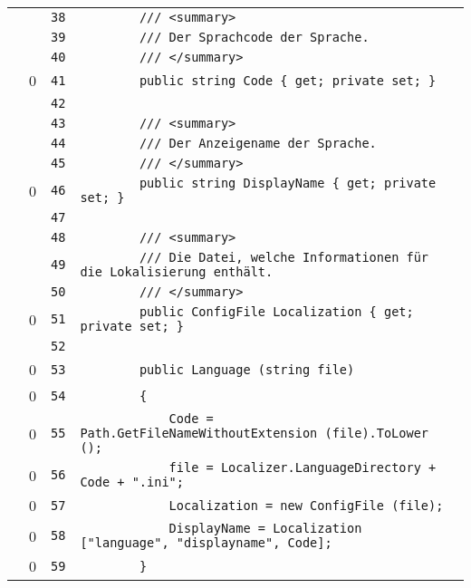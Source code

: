 \documentclass[a4paper,10pt]{article}
\begin{document}
\begin{longtable}[l]{lrrl}
\cellcolor{gray} &  & \verb~38~ & \verb~        /// <summary>~\\
\cellcolor{gray} &  & \verb~39~ & \verb~        /// Der Sprachcode der Sprache.~\\
\cellcolor{gray} &  & \verb~40~ & \verb~        /// </summary>~\\
\cellcolor{red} & 0 & \verb~41~ & \verb~        public string Code { get; private set; }~\\
\cellcolor{gray} &  & \verb~42~ & \verb~~\\
\cellcolor{gray} &  & \verb~43~ & \verb~        /// <summary>~\\
\cellcolor{gray} &  & \verb~44~ & \verb~        /// Der Anzeigename der Sprache.~\\
\cellcolor{gray} &  & \verb~45~ & \verb~        /// </summary>~\\
\cellcolor{red} & 0 & \verb~46~ & \verb~        public string DisplayName { get; private set; }~\\
\cellcolor{gray} &  & \verb~47~ & \verb~~\\
\cellcolor{gray} &  & \verb~48~ & \verb~        /// <summary>~\\
\cellcolor{gray} &  & \verb~49~ & \verb~        /// Die Datei, welche Informationen für die Lokalisierung enthält.~\\
\cellcolor{gray} &  & \verb~50~ & \verb~        /// </summary>~\\
\cellcolor{red} & 0 & \verb~51~ & \verb~        public ConfigFile Localization { get; private set; }~\\
\cellcolor{gray} &  & \verb~52~ & \verb~~\\
\cellcolor{red} & 0 & \verb~53~ & \verb~        public Language (string file)~\\
\cellcolor{red} & 0 & \verb~54~ & \verb~        {~\\
\cellcolor{red} & 0 & \verb~55~ & \verb~            Code = Path.GetFileNameWithoutExtension (file).ToLower ();~\\
\cellcolor{red} & 0 & \verb~56~ & \verb~            file = Localizer.LanguageDirectory + Code + ".ini";~\\
\cellcolor{red} & 0 & \verb~57~ & \verb~            Localization = new ConfigFile (file);~\\
\cellcolor{red} & 0 & \verb~58~ & \verb~            DisplayName = Localization ["language", "displayname", Code];~\\
\cellcolor{red} & 0 & \verb~59~ & \verb~        }~\\

\end{longtable}
\end{document}
